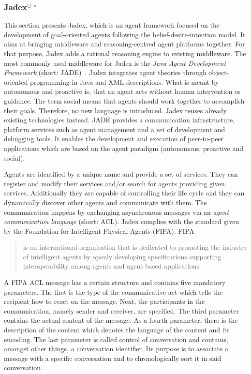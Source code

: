 \subsubsection[Jadex]{Jadex$^{\odot,\circ}$}\label{fun:apl_jadex}
This section presents Jadex, which is an agent framework focused on the development of goal-oriented agents following the belief-desire-intention model.
It aims at bringing middleware and reasoning-centred agent platforms together.
For that purpose, Jadex adds a rational reasoning engine to existing middleware.
The most commonly used middleware for Jadex is the \emph{Java Agent Development Framework} (short: JADE)~\cite{bellifemine_jade_2005}. %
Jadex integrates agent theories through object-oriented programming in Java and XML descriptions. What is meant by autonomous and proactive is, that an agent acts without human intervention or guidance. The term social means that agents should work together to accomplish their goals.
Therefore, no new language is introduced.
Jadex reuses already existing technologies instead.
JADE provides a communication infrastructure, platform services such as agent management and a set of development and debugging tools.
It enables the development and execution of peer-to-peer applications which are based on the agent paradigm (autonomous, proactive and social). %

Agents are identified by a unique name and provide a set of services.
They can register and modify their services and/or search for agents providing given services.
Additionally they are capable of controlling their life cycle and they can dynamically discover other agents and communicate with them.
The communication happens by exchanging asynchronous messages via an \emph{agent communication language} (short: ACL).
Jadex complies with the standard given by the Foundation for Intelligent Physical Agents (FIPA).
FIPA \blockquote[\cite{FIPA}][.]{is an international organisation that is dedicated to promoting the industry of intelligent agents by openly developing specifications supporting interoperability among agents and agent-based applications}
A FIPA ACL message has a certain structure and contains five mandatory parameters.
The first is the type of the communicative act which tells the recipient how to react on the message.
Next, the participants in the communication, namely sender and receiver, are specified.
The third parameter contains the actual content of the message.
As a fourth parameter, there is the description of the content which denotes the language of the content and its encoding.
The last parameter is called control of conversation and contains, amongst other things, a conversation identifier.
Its purpose is to associate a message with a specific conversation and to chronologically sort it in said conversation.

